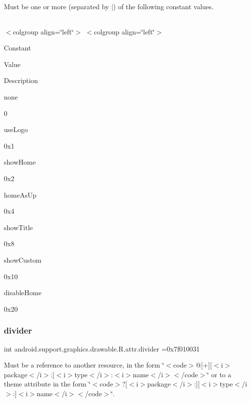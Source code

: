 Must be one or more (separated by \textquotesingle{}$\vert$\textquotesingle{}) of the following constant values.

\tabulinesep=1mm
\begin{longtabu} spread 0pt [c]{*{0}{|X[-1]}|}
\hline
\end{longtabu}
$<$colgroup align=\char`\"{}left\char`\"{}$>$ $<$colgroup align=\char`\"{}left\char`\"{}$>$ 

Constant

Value

Description 

{\ttfamily none}

0

{\ttfamily use\+Logo}

0x1

{\ttfamily show\+Home}

0x2

{\ttfamily home\+As\+Up}

0x4

{\ttfamily show\+Title}

0x8

{\ttfamily show\+Custom}

0x10

{\ttfamily disable\+Home}

0x20\mbox{\label{classandroid_1_1support_1_1graphics_1_1drawable_1_1R_1_1attr_a7e6802e202ef19d78571d292a9a625c4}} 
\subsubsection{\texorpdfstring{divider}{divider}}
{\footnotesize\ttfamily int android.\+support.\+graphics.\+drawable.\+R.\+attr.\+divider =0x7f010031\hspace{0.3cm}{\ttfamily [static]}}

Must be a reference to another resource, in the form \char`\"{}$<$code$>$@\mbox{[}+\mbox{]}\mbox{[}$<$i$>$package$<$/i$>$\+:\mbox{]}$<$i$>$type$<$/i$>$\+:$<$i$>$name$<$/i$>$$<$/code$>$\char`\"{} or to a theme attribute in the form \char`\"{}$<$code$>$?\mbox{[}$<$i$>$package$<$/i$>$\+:\mbox{]}\mbox{[}$<$i$>$type$<$/i$>$\+:\mbox{]}$<$i$>$name$<$/i$>$$<$/code$>$\char`\"{}. \mbox{\label{classandroid_1_1support_1_1graphics_1_1drawable_1_1R_1_1attr_adb87a43c21b1e787bd6bd10eaf3d3b57}} 
